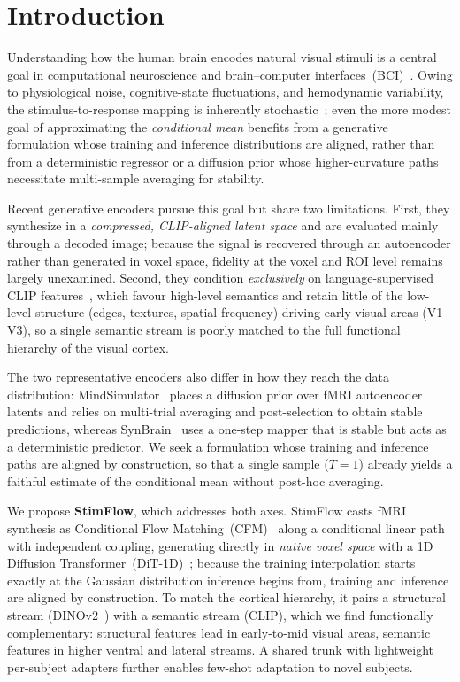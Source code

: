\documentclass[runningheads]{llncs}
\begin{document}
\section{Introduction}
\label{sec:intro}
Understanding how the human brain encodes natural visual stimuli is a central goal in
computational neuroscience and brain--computer interfaces~(BCI)~\cite{naselaris2011,Mitchell2008PredictingHB,Haxby2001DistributedAO}.
Owing to physiological noise, cognitive-state fluctuations, and hemodynamic variability,
the stimulus-to-response mapping is inherently stochastic~\cite{nsd}; even the more modest
goal of approximating the \emph{conditional mean} benefits from a generative formulation
whose training and inference distributions are aligned, rather than from a deterministic
regressor or a diffusion prior whose higher-curvature paths necessitate multi-sample
averaging for stability.

Recent generative encoders pursue this goal but share two limitations. First, they
synthesize in a \emph{compressed, CLIP-aligned latent space} and are evaluated mainly through a
decoded image; because the signal is recovered through an autoencoder rather than generated in
voxel space, fidelity at the voxel and ROI level remains largely unexamined. Second, they
condition \emph{exclusively} on language-supervised CLIP features~\cite{clip}, which favour
high-level semantics and retain little of the low-level structure (edges, textures, spatial
frequency) driving early visual areas (V1--V3), so a single semantic stream is poorly matched
to the full functional hierarchy of the visual cortex.

The two representative encoders also differ in how they reach the data distribution:
MindSimulator~\cite{mindsimulator} places a diffusion prior over fMRI autoencoder latents
and relies on multi-trial averaging and post-selection to obtain stable predictions,
whereas SynBrain~\cite{synbrain} uses a one-step mapper that is stable but acts as a
deterministic predictor. We seek a formulation whose training and inference paths are
aligned by construction, so that a single sample ($T{=}1$) already yields a faithful
estimate of the conditional mean without post-hoc averaging.

We propose \textbf{StimFlow}, which addresses both axes. StimFlow casts fMRI synthesis as
Conditional Flow Matching~(CFM)~\cite{lipman2023,rectifiedflow} along a conditional
linear path with independent coupling, generating directly in \emph{native voxel space} with a 1D Diffusion
Transformer~(DiT-1D)~\cite{dit}; because the training interpolation starts exactly at the
Gaussian distribution inference begins from, training and inference are aligned by
construction. To match the cortical hierarchy, it pairs a structural stream
(DINOv2~\cite{dinov2}) with a semantic stream (CLIP), which we find functionally
complementary: structural features lead in early-to-mid visual areas, semantic
features in higher ventral and lateral streams. A shared trunk with lightweight per-subject
adapters further enables few-shot adaptation to novel subjects.
\end{document}
